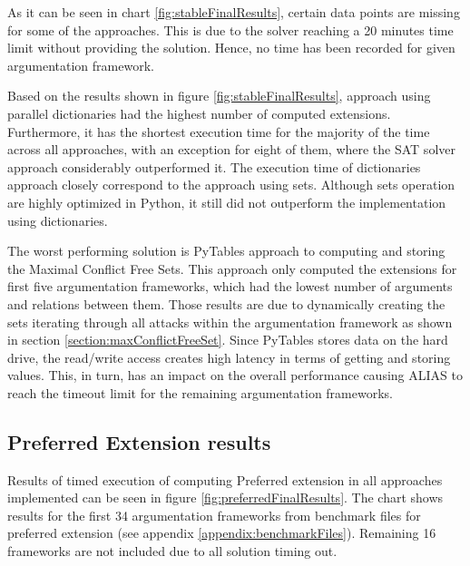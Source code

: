 As it can be seen in chart \ref{fig:stableFinalResults}, certain data points are missing for some of the approaches. This is due to the solver reaching a 20 minutes time limit without providing the solution. Hence, no time has been recorded for given argumentation framework.

Based on the results shown in figure \ref{fig:stableFinalResults}, approach using parallel dictionaries had the highest number of  computed extensions. Furthermore, it has the shortest execution time for the majority of the time across all approaches, with an exception for eight of them, where the SAT solver approach considerably outperformed it. The execution time of dictionaries approach closely correspond to the approach using sets. Although sets operation are highly optimized in Python, it still did not outperform the implementation using dictionaries.

The worst performing solution is PyTables approach to computing and storing the Maximal Conflict Free Sets. This approach only computed the extensions for first five argumentation frameworks, which had the lowest number of arguments and relations between them. Those results are due to dynamically creating the sets iterating through all attacks within the argumentation framework as shown in section \ref{section:maxConflictFreeSet}. Since PyTables stores data on the hard drive, the read/write access creates high latency in terms of getting and storing values. This, in turn, has an impact on the overall performance causing ALIAS to reach the timeout limit for the remaining argumentation frameworks.


\subsection{Preferred Extension results} \label{section:preferredExtensionResults}
Results of timed execution of computing Preferred extension in all approaches implemented can be seen in figure \ref{fig:preferredFinalResults}. The chart shows results for the first 34 argumentation frameworks from benchmark files for preferred extension (see appendix \ref{appendix:benchmarkFiles}). Remaining 16 frameworks are not included due to all solution timing out.

